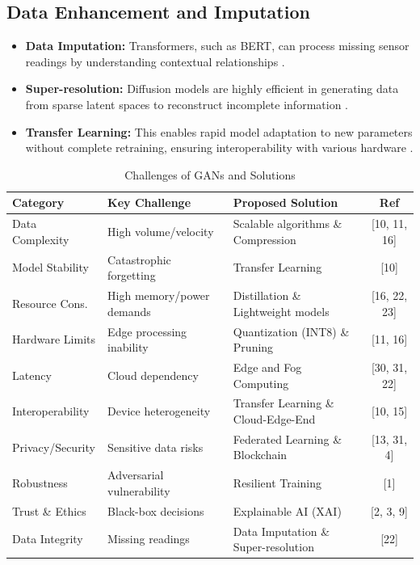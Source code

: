\documentclass[journal]{IEEEtran}
\begin{document}
\subsection{Data Enhancement and Imputation}
\begin{itemize}
    \item \textbf{Data Imputation:} Transformers, such as BERT, can process missing sensor readings by understanding contextual relationships \cite{22}.
    \item \textbf{Super-resolution:} Diffusion models are highly efficient in generating data from sparse latent spaces to reconstruct incomplete information \cite{22}.
    \item \textbf{Transfer Learning:} This enables rapid model adaptation to new parameters without complete retraining, ensuring interoperability with various hardware \cite{10}.
\end{itemize}
\begin{table}[ht]
\centering
\caption{Challenges of GANs and Solutions}
\label{table:gans_challenges}
\small
\setlength{\tabcolsep}{3pt} %
\begin{tabular}{@{} p{1.6cm} p{2.4cm} p{2.8cm} c @{}}
\toprule
\textbf{Category} & \textbf{Key Challenge} & \textbf{Proposed Solution} & \textbf{Ref} \\
\midrule
Data Complexity & High volume/velocity & Scalable algorithms \& Compression & [10, 11, 16] \\
\addlinespace
Model Stability & Catastrophic forgetting & Transfer Learning & [10] \\
\addlinespace
Resource Cons. & High memory/power demands & Distillation \& Lightweight models & [16, 22, 23] \\
\addlinespace
Hardware Limits & Edge processing inability & Quantization (INT8) \& Pruning & [11, 16] \\
\addlinespace
Latency & Cloud dependency & Edge and Fog Computing & [30, 31, 22] \\
\addlinespace
Interoperability & Device heterogeneity & Transfer Learning \& Cloud-Edge-End & [10, 15] \\
\addlinespace
Privacy/Security & Sensitive data risks & Federated Learning \& Blockchain & [13, 31, 4] \\
\addlinespace
Robustness & Adversarial vulnerability & Resilient Training & [1] \\
\addlinespace
Trust \& Ethics & Black-box decisions & Explainable AI (XAI) & [2, 3, 9] \\
\addlinespace
Data Integrity & Missing readings & Data Imputation \& Super-resolution & [22] \\
\bottomrule
\end{tabular}
\end{table}
\end{document}
